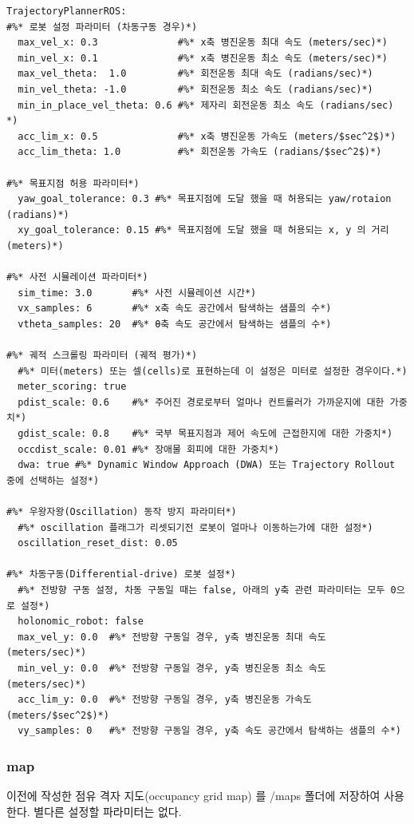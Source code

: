 \begin{lstlisting}[language=ROS]
TrajectoryPlannerROS:
#%* 로봇 설정 파라미터 (차동구동 경우)*)
  max_vel_x: 0.3              #%* x축 병진운동 최대 속도 (meters/sec)*)
  min_vel_x: 0.1              #%* x축 병진운동 최소 속도 (meters/sec)*)
  max_vel_theta:  1.0         #%* 회전운동 최대 속도 (radians/sec)*)
  min_vel_theta: -1.0         #%* 회전운동 최소 속도 (radians/sec)*)
  min_in_place_vel_theta: 0.6 #%* 제자리 회전운동 최소 속도 (radians/sec) *)
  acc_lim_x: 0.5              #%* x축 병진운동 가속도 (meters/$sec^2$)*)
  acc_lim_theta: 1.0          #%* 회전운동 가속도 (radians/$sec^2$)*)

#%* 목표지점 허용 파라미터*)
  yaw_goal_tolerance: 0.3 #%* 목표지점에 도달 했을 때 허용되는 yaw/rotaion (radians)*)
  xy_goal_tolerance: 0.15 #%* 목표지점에 도달 했을 때 허용되는 x, y 의 거리 (meters)*)

#%* 사전 시뮬레이션 파라미터*)
  sim_time: 3.0       #%* 사전 시뮬레이션 시간*)
  vx_samples: 6       #%* x축 속도 공간에서 탐색하는 샘플의 수*)
  vtheta_samples: 20  #%* θ축 속도 공간에서 탐색하는 샘플의 수*)

#%* 궤적 스크롤링 파라미터 (궤적 평가)*)
  #%* 미터(meters) 또는 셀(cells)로 표현하는데 이 설정은 미터로 설정한 경우이다.*)
  meter_scoring: true 
  pdist_scale: 0.6    #%* 주어진 경로로부터 얼마나 컨트롤러가 가까운지에 대한 가중치*)
  gdist_scale: 0.8    #%* 국부 목표지점과 제어 속도에 근접한지에 대한 가중치*)
  occdist_scale: 0.01 #%* 장애물 회피에 대한 가중치*)
  dwa: true #%* Dynamic Window Approach (DWA) 또는 Trajectory Rollout 중에 선택하는 설정*)

#%* 우왕자왕(Oscillation) 동작 방지 파라미터*)
  #%* oscillation 플래그가 리셋되기전 로봇이 얼마나 이동하는가에 대한 설정*)
  oscillation_reset_dist: 0.05 

#%* 차동구동(Differential-drive) 로봇 설정*)
  #%* 전방향 구동 설정, 차동 구동일 때는 false, 아래의 y축 관련 파라미터는 모두 0으로 설정*)
  holonomic_robot: false 
  max_vel_y: 0.0  #%* 전방향 구동일 경우, y축 병진운동 최대 속도 (meters/sec)*)
  min_vel_y: 0.0  #%* 전방향 구동일 경우, y축 병진운동 최소 속도 (meters/sec)*)
  acc_lim_y: 0.0  #%* 전방향 구동일 경우, y축 병진운동 가속도 (meters/$sec^2$)*)
  vy_samples: 0   #%* 전방향 구동일 경우, y축 속도 공간에서 탐색하는 샘플의 수*)
\end{lstlisting}

\subsubsection{map}
이전에 작성한 점유 격자 지도(occupancy grid map) 를 /maps 폴더에 저장하여 사용한다. 별다른 설정할 파라미터는 없다.


